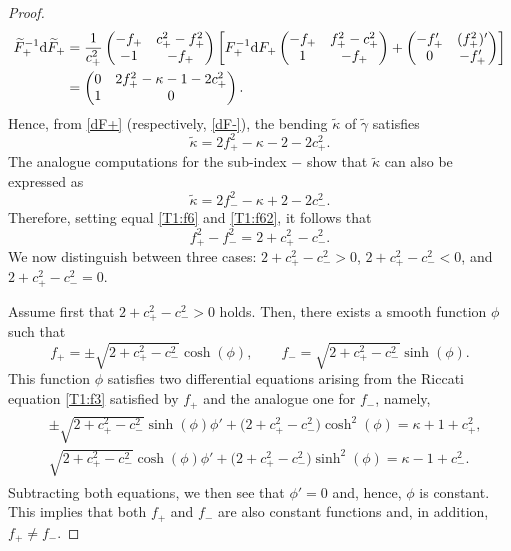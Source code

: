 \documentclass[10pt,a4paper]{amsart}
\numberwithin{equation}{section}
\def\bending{\kappa}
\begin{document}
\begin{proof}
	\begin{align*}
		\widetilde{F}_+^{-1}{\rm d}\widetilde{F}_+&{}=\frac{1}{c_+^2}\begin{pmatrix} -f_+ & c_+^2-f_+^2 \\ -1 & -f_+ \end{pmatrix}\biggl[F_+^{-1}{\rm d}F_+\begin{pmatrix} -f_+ & f_+^2-c_+^2 \\ 1 & -f_+\end{pmatrix}+\begin{pmatrix} -f_+' & (f_+^2)' \\ 0 & -f_+'\end{pmatrix} \biggr]\\
		&{}=\begin{pmatrix} 0 & 2f_+^2-\bending-1-2c_+^2 \\ 1 & 0 \end{pmatrix}.
	\end{align*}
	Hence, from \eqref{dF+} (respectively, \eqref{dF-}), the bending $\widetilde{\bending}$ of $\widetilde{\gamma}$ satisfies
	\begin{equation}\label{T1:f6}
		\widetilde{\bending}=2f_+^2-\bending-2-2c_+^2.
	\end{equation}
	The analogue computations for the sub-index $-$ show that $\widetilde{\bending}$ can also be expressed as
	\begin{equation}\label{T1:f62}
		\widetilde{\bending}=2f_-^2-\bending+2-2c_-^2.
	\end{equation}
	Therefore, setting equal \eqref{T1:f6} and \eqref{T1:f62}, it follows that
	\begin{equation*}%
		f_+^2-f_-^2=2+c_+^2-c_-^2.
	\end{equation*}
	We now distinguish between three cases: $2+c_+^2-c_-^2>0$, $2+c_+^2-c_-^2<0$, and $2+c_+^2-c_-^2=0$.
	
	Assume first that $2+c_+^2-c_-^2>0$ holds. Then, there exists a smooth function $\phi$ such that
	\begin{equation*}
		f_+=\pm\sqrt{2+c_+^2-c_-^2}\cosh(\phi),\qquad
		f_-=\sqrt{2+c_+^2-c_-^2}\sinh(\phi).
	\end{equation*}
	This function $\phi$ satisfies two differential equations arising from the Riccati equation \eqref{T1:f3} satisfied by $f_+$ and the analogue one for $f_-$, namely,
	\begin{gather*}
\begin{split}
&\pm\sqrt{2+c_+^2-c_-^2}\sinh(\phi)\phi'+\bigl(2+c_+^2-c_-^2\bigr)\cosh^2(\phi)=\bending+1+c_+^2,\\
&\sqrt{2+c_+^2-c_-^2}\cosh(\phi)\phi'+\bigl(2+c_+^2-c_-^2\bigr)\sinh^2(\phi)=\bending-1+c_-^2.
\end{split}
	\end{gather*}
	Subtracting both equations, we then see that $\phi'=0$ and, hence, $\phi$ is constant. This implies that both $f_+$ and $f_-$ are also constant functions and, in addition, $f_+\neq f_-$.
	

\end{proof}
\end{document}
